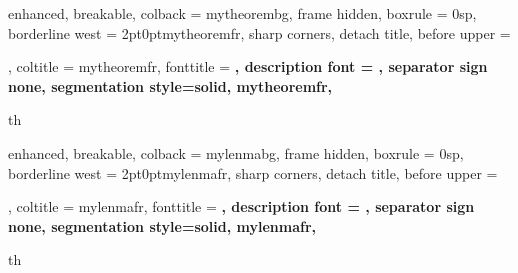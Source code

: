 
\makeatletter
{}
\makeatother


{%
	enhanced,
	breakable,
	colback = mytheorembg,
	frame hidden,
	boxrule = 0sp,
	borderline west = {2pt}{0pt}{mytheoremfr},
	sharp corners,
	detach title,
	before upper = \tcbtitle\par\smallskip,
	coltitle = mytheoremfr,
	fonttitle = \bfseries\sffamily,
	description font = \mdseries,
	separator sign none,
	segmentation style={solid, mytheoremfr},
}
{th}


{%
	enhanced,
	breakable,
	colback = mylenmabg,
	frame hidden,
	boxrule = 0sp,
	borderline west = {2pt}{0pt}{mylenmafr},
	sharp corners,
	detach title,
	before upper = \tcbtitle\par\smallskip,
	coltitle = mylenmafr,
	fonttitle = \bfseries\sffamily,
	description font = \mdseries,
	separator sign none,
	segmentation style={solid, mylenmafr},
}
{th}


\newcommand{\thm}[2]{\begin{Theorem*}{#1}{}#2\end{Theorem*}}
\newcommand{\qs}[2]{\begin{question*}{#1}{}#2\end{question*}}
\newcommand{\prp}[2]{\begin{Property*}{#1}{}#2\end{Property*}}
\newcommand{\lemma}[2]{\begin{Lemma*}{#1}{}#2\end{Lemma*}}



\hfuzz=125pt      %

\usetikzlibrary{arrows.meta, calc, decorations.markings, backgrounds}
\usepackage{esint}
